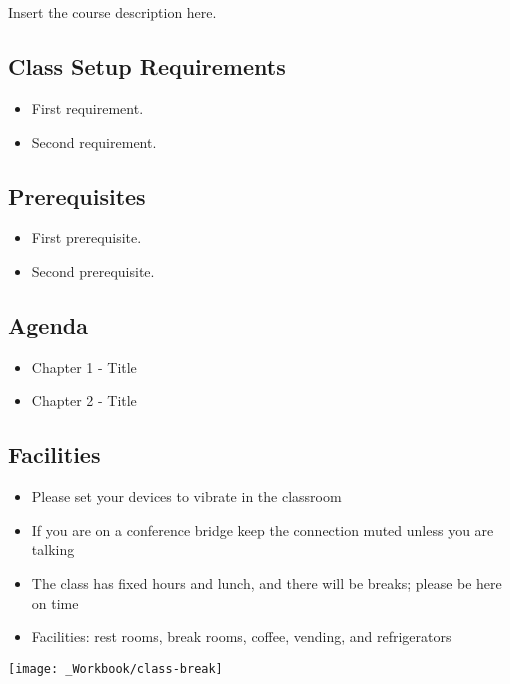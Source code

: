 \documentclass[../workbook]{subfiles}
\begin{document}

\section*{\bookcoursenumber \bookmajortitle}

Insert the course description here.



\subsection*{Class Setup Requirements}

\begin{itemize}
    \item First requirement.
    \item Second requirement.
\end{itemize}



\subsection*{Prerequisites}

\begin{itemize}
    \item First prerequisite.
    \item Second prerequisite.
\end{itemize}



\subsection*{Agenda}

\begin{itemize}
    \item Chapter 1 - Title
    \item Chapter 2 - Title
\end{itemize}



\subsection*{Facilities}

\begin{itemize}
    \item Please set your devices to vibrate in the classroom
    \item If you are on a conference bridge keep the connection muted unless you are talking
    \item The class has fixed hours and lunch, and there will be breaks; please be here on time
    \item Facilities: rest rooms, break rooms, coffee, vending, and refrigerators
\end{itemize}

\edef\measurepage{\the\dimexpr\pagegoal-\pagetotal-\baselineskip\relax}
\mbox{}\hfill\texttt{[image: \_Workbook/class-break]}
\end{document}
